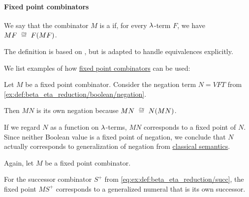 \paragraph{Fixed point combinators}

\begin{definition}\label{def:fixed_point_combinator}\mimprovised
  We say that the combinator \( M \) is a  if, for every \( \mathrm{\lambda} \)-term \( F \), we have \( MF \beequiv F(MF) \).
\end{definition}
\begin{comments}
  \item The definition is based on \cite[6.1.2]{Barendregt1984}, but is adapted to handle equivalences explicitly.
\end{comments}

\begin{example}\label{ex:def:fixed_point_combinator}
  We list examples of how \hyperref[def:fixed_point_combinator]{fixed point combinators} can be used:
  \begin{thmenum}
     Let \( M \) be a fixed point combinator. Consider the negation term \( N = VFT \) from \eqref{ex:def:beta_eta_reduction/boolean/negation}.

    Then \( MN \) is its own negation because \( MN \beequiv N(MN) \).

    If we regard \( N \) as a function on \( \mathrm{\lambda} \)-terms, \( MN \) corresponds to a fixed point of \( N \). Since neither Boolean value is a fixed point of negation, we conclude that \( N \) actually corresponds to generalization of negation from \hyperref[def:classical_semantics]{classical semantics}.

     Again, let \( M \) be a fixed point combinator.

    For the successor combinator \( S^+ \) from \eqref{eq:ex:def:beta_eta_reduction/succ}, the fixed point \( MS^+ \) corresponds to a generalized numeral that is its own successor.
  \end{thmenum}
\end{example}

